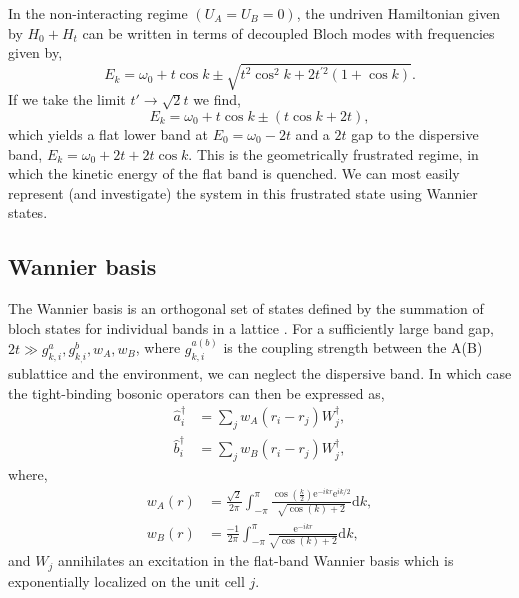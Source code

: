 In the non-interacting regime \((U_{A} = U_{B} = 0)\), the undriven Hamiltonian given by \(H_{0} + H_{t}\) can be written in terms of decoupled Bloch modes with frequencies given by,
\begin{equation}
	E_{k} = \omega_{0} + t \cos k \pm \sqrt{t^{2}\cos^{2}k + 2t^{'2}(1+\cos k)}.
	\label{eq:dim1-6}
\end{equation}
If we take the limit \(t' \rightarrow \sqrt{2}t\) we find,
\begin{equation}
	E_{k} = \omega_{0} + t \cos k \pm (t\cos k + 2t),
	\label{eq:dim1-7}
\end{equation}
which yields a flat lower band at \(E_{0} = \omega_{0} - 2t\) and a \(2t\) gap to the dispersive band, \(E_{k} = \omega_{0} + 2t + 2t\cos k\). This is the geometrically frustrated regime, in which the kinetic energy of the flat band is quenched. We can most easily represent (and investigate) the system in this frustrated state using Wannier states.

\subsection{Wannier basis} 
The Wannier basis is an orthogonal set of states defined by the summation of bloch states for individual bands in a lattice \cite{Wannier1937}. For a sufficiently large band gap, \(2t \gg g_{k,i}^{a},g_{k_,i}^{b},w_{A},w_{B}\), where \(g_{k,i}^{a(b)}\) is the coupling strength between the A(B) sublattice and the environment, we can neglect the dispersive band. In which case the tight-binding bosonic operators can then be expressed as,
\begin{align}
	\hat{a}_{i}^{\dagger} &= \sum_{j} w_{A}(r_{i} - r_{j}) W_{j}^{\dagger}, \label{eq:dim1-8} \\
	\hat{b}_{i}^{\dagger} &= \sum_{j} w_{B}(r_{i} - r_{j}) W_{j}^{\dagger}, \label{eq:dim1-9}  
\end{align}
where,
\begin{align}
	w_{A}(r) &= \frac{\sqrt{2}}{2\pi} \int^{\pi}_{-\pi} \frac{\cos\left(\frac{k}{2}\right)\mathrm{e}^{-ikr}\mathrm{e}^{ik/2}}{\sqrt{\cos(k) + 2}} \mathrm{d}k, \label{eq:dim1-10} \\
	w_{B}(r) &= \frac{-1}{2\pi} \int^{\pi}_{-\pi} \frac{\mathrm{e}^{-ikr}}{\sqrt{\cos(k) + 2}} \mathrm{d}k, \label{eq:dim1-11}
\end{align}
and \(W_{j}\) annihilates an excitation in the flat-band Wannier basis which is exponentially localized on the unit cell \(j\).

